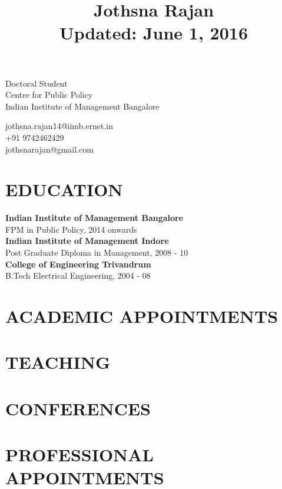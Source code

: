 \documentclass[12pt, a4paper]{article}
\title{\textbf{Jothsna Rajan \\ \small{Updated: June 1, 2016} }}
\date{}
\begin{document}
\maketitle
\begin{multicols}{2}

\begin{flushleft}
	\noindent Doctoral Student \\
	Centre for Public Policy \\
	Indian Institute of Management Bangalore \\
\end{flushleft}
\begin{flushright}
	\noindent jothsna.rajan14@iimb.ernet.in \\
	+91 9742462429 \\
	jothsnarajan@gmail.com \\
\end{flushright}
\end{multicols}
\section*{EDUCATION}

\noindent\textbf{Indian Institute of Management Bangalore} \\
FPM in Public Policy, 2014 onwards \\

\noindent\textbf{Indian Institute of Management Indore} \\
Post Graduate Diploma in Management, 2008 - 10 \\

\noindent\textbf{College of Engineering Trivandrum} \\
B.Tech Electrical Engineering, 2004 - 08

\section*{ACADEMIC APPOINTMENTS}
\section*{TEACHING}
\section*{CONFERENCES} 
\section*{PROFESSIONAL APPOINTMENTS}
\end{document}
